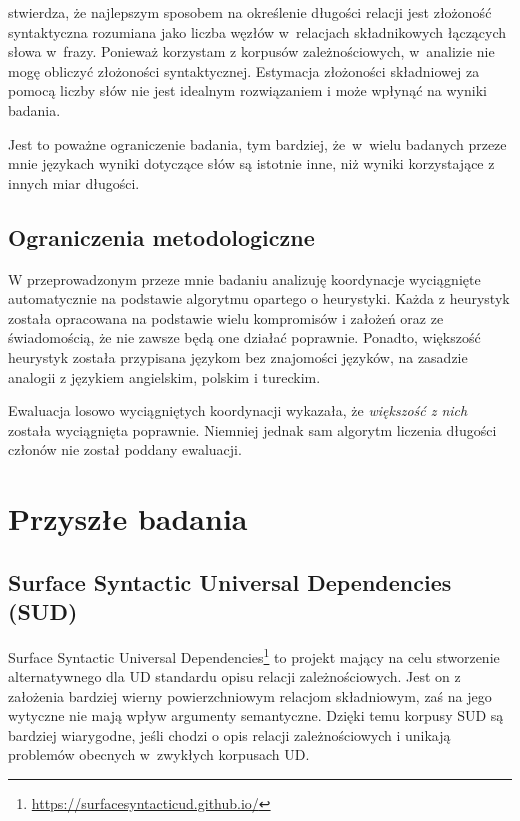 \cite{lohmann2014english} stwierdza, że najlepszym sposobem na określenie długości relacji jest złożoność syntaktyczna rozumiana jako liczba węzłów w~relacjach składnikowych łączących słowa w~frazy. Ponieważ korzystam z korpusów zależnościowych, w~analizie nie mogę obliczyć złożoności syntaktycznej. Estymacja złożoności składniowej za pomocą liczby słów nie jest idealnym rozwiązaniem i może wpłynąć na wyniki badania.

Jest to poważne ograniczenie badania, tym bardziej, że~w~wielu badanych przeze mnie językach wyniki dotyczące słów są istotnie inne, niż wyniki korzystające z innych miar długości.

\subsection{Ograniczenia metodologiczne}

W przeprowadzonym przeze mnie badaniu analizuję koordynacje wyciągnięte automatycznie na podstawie algorytmu opartego o heurystyki. Każda z heurystyk została opracowana na podstawie wielu kompromisów i założeń oraz ze świadomością, że nie zawsze będą one działać poprawnie. Ponadto, większość heurystyk została przypisana językom bez znajomości języków, na zasadzie analogii z językiem angielskim, polskim i tureckim.

Ewaluacja losowo wyciągniętych koordynacji wykazała, że \textit{większość z nich} została wyciągnięta poprawnie. Niemniej jednak sam algorytm liczenia długości członów nie został poddany ewaluacji.

\section{Przyszłe badania}

\subsection{Surface Syntactic Universal Dependencies (SUD)}

Surface Syntactic Universal Dependencies\footnote{
\url{https://surfacesyntacticud.github.io/}
} to projekt mający na celu stworzenie alternatywnego dla UD standardu opisu relacji zależnościowych. Jest on z założenia bardziej wierny powierzchniowym relacjom składniowym, zaś na jego wytyczne nie mają wpływ argumenty semantyczne. Dzięki temu korpusy SUD są bardziej wiarygodne, jeśli chodzi o opis relacji zależnościowych i unikają problemów obecnych w~zwykłych korpusach UD.

